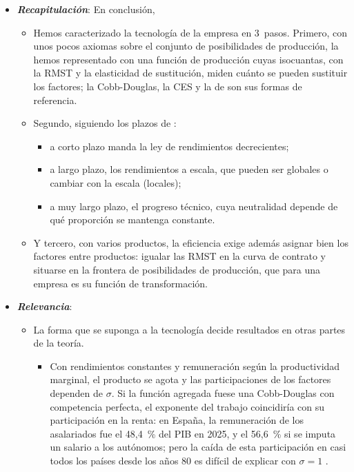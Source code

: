 \documentclass[11pt]{article}
\begin{document}
\begin{itemize}
\item \textbf{\emph{Recapitulación}}: En conclusión,
  \begin{itemize}
  \item Hemos caracterizado la tecnología de la empresa en 3~pasos. Primero, con unos pocos axiomas sobre el conjunto de posibilidades de producción, la hemos representado con una función de producción cuyas isocuantas, con la RMST y la elasticidad de sustitución, miden cuánto se pueden sustituir los factores; la Cobb-Douglas, la CES y la de  son sus formas de referencia.
  \item Segundo, siguiendo los plazos de :
    \begin{itemize}
    \item a corto plazo manda la ley de rendimientos decrecientes;
    \item a largo plazo, los rendimientos a escala, que pueden ser globales o cambiar con la escala (locales);
    \item a muy largo plazo, el progreso técnico, cuya neutralidad depende de qué proporción se mantenga constante.
    \end{itemize}
  \item Y tercero, con varios productos, la eficiencia exige además asignar bien los factores entre productos: igualar las RMST en la curva de contrato y situarse en la frontera de posibilidades de producción, que para una empresa es su función de transformación.
  \end{itemize}
\item \textbf{\emph{Relevancia}}:
  \begin{itemize}
  \item La forma que se suponga a la tecnología decide resultados en otras partes de la teoría.
  \begin{itemize}
  \item Con rendimientos constantes y remuneración según la productividad marginal, el producto se agota y las participaciones de los factores dependen de $\sigma$. Si la función agregada fuese una Cobb-Douglas con competencia perfecta, el exponente del trabajo coincidiría con su participación en la renta: en España, la remuneración de los asalariados fue el 48,4~\% del PIB en 2025\nocite{Eurostat2026Nama10gdp}, y el 56,6~\% si se imputa un salario a los autónomos\nocite{AMECO2026WageShare}; pero la caída de esta participación en casi todos los países desde los años 80\nocite{KarabarbounisNeiman2014Global} es difícil de explicar con $\sigma=1$  .

\end{itemize}
\end{itemize}
\end{itemize}
\end{document}
